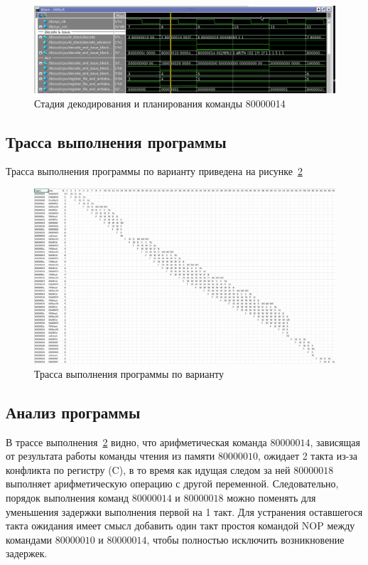 \begin{figure}[H]
	\centering
	\includegraphics[width=1\textwidth]{images/taskvar_D+CC+AL.png}
	\caption{Стадия декодирования и планирования команды 80000014}
	\label{img:taskvar_D+CC+ALU}
\end{figure}
\clearpage

\subsection{Трасса выполнения программы}

Трасса выполнения программы по варианту приведена на рисунке~\ref{img:var3_trace}

\begin{figure}[H]
	\centering
	\includegraphics[width=1\textwidth]{images/var3_trace.png}
	\caption{Трасса выполнения программы по варианту}
	\label{img:var3_trace}
\end{figure}

\subsection{Анализ программы}

В трассе выполнения~\ref{img:var3_trace} видно, что арифметическая команда $80000014$, зависящая от результата работы команды чтения из памяти $80000010$, ожидает 2 такта из-за конфликта по регистру (C), в то время как идущая следом за ней $80000018$ выполняет арифметическую операцию с другой переменной. Следовательно, порядок выполнения команд $80000014$ и $80000018$ можно поменять для уменьшения задержки выполнения первой на 1 такт. Для устранения оставшегося такта ожидания имеет смысл добавить один такт простоя командой NOP между командами $80000010$ и $80000014$, чтобы полностью исключить возникновение задержек.
\clearpage

